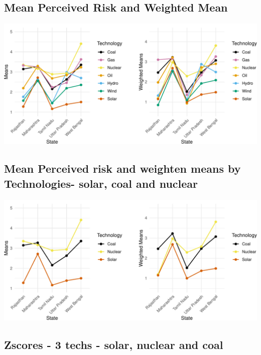\documentclass[
]{article}
\begin{document}
\newpage

\hypertarget{mean-perceived-risk-and-weighted-mean}{%
\subsection{Mean Perceived Risk and Weighted
Mean}\label{mean-perceived-risk-and-weighted-mean}}

\includegraphics[width=1\linewidth,height=1\textheight]{nuclear-in-comparison_files/figure-latex/unnamed-chunk-29-1}

\newpage

\hypertarget{mean-perceived-risk-and-weighten-means-by-technologies--solar-coal-and-nuclear}{%
\subsection{Mean Perceived risk and weighten means by Technologies-
solar, coal and
nuclear}\label{mean-perceived-risk-and-weighten-means-by-technologies--solar-coal-and-nuclear}}

\includegraphics[width=1\linewidth,height=1\textheight]{nuclear-in-comparison_files/figure-latex/unnamed-chunk-33-1}

\hypertarget{zscores---3-techs---solar-nuclear-and-coal}{%
\subsection{Zscores - 3 techs - solar, nuclear and
coal}\label{zscores---3-techs---solar-nuclear-and-coal}}
\end{document}
